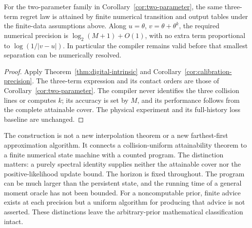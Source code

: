 \begin{corollary}
\label{cor:digital-contact}
For the two-parameter family in Corollary~\ref{cor:two-parameter}, the
same three-term regret law is attained by finite numerical transition
and output tables under the finite-data assumptions above. Along
$u=\theta$, $v=\theta+\theta^k$, the required numerical precision is
$\log_2(M+1)+O(1)$, with no extra term proportional to
$\log(1/|v-u|)$. In particular the compiler remains valid before that
smallest separation can be numerically resolved.
\end{corollary}
\begin{proof}
Apply Theorem~\ref{thm:digital-intrinsic} and
Corollary~\ref{cor:calibration-precision}. The three-term expression and
its contact orders are those of Corollary~\ref{cor:two-parameter}.
The compiler never identifies the three collision lines or computes
$k$; its accuracy is set by $M$, and its performance follows from the
complete attainable cover. The physical experiment and its full-history
loss baseline are unchanged.
\end{proof}

The construction is not a new interpolation theorem or a new
farthest-first approximation algorithm. It connects a collision-uniform
attainability theorem to a finite numerical state machine with a counted
program. The distinction matters: a purely spectral identity supplies
neither the attainable cover nor the positive-likelihood update bound.
The horizon is fixed throughout. The program can be much larger than
the persistent state, and the running time of a general moment oracle
has not been bounded. For a noncomputable prior, finite advice exists
at each precision but a uniform algorithm for producing that advice is
not asserted. These distinctions leave the arbitrary-prior mathematical
classification intact.
